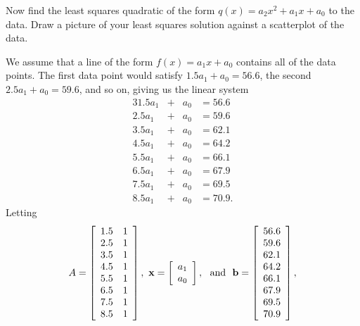 \begin{example}
		
	\item Now find the least squares quadratic of the form $q(x) = a_2x^2+a_1x+a_0$ to the data. Draw a picture of your least squares solution against a scatterplot of the data. 

	
	\ea
	


\ExampleSolution

	\ba
	\item We assume that a line of the form $f(x) = a_1x+a_0$ contains all of the data points.  The first data point would satisfy $1.5a_1+a_0 = 56.6$, the second $2.5a_1+a_0 = 59.6$, and so on, giving us the linear system
\begin{alignat*}{3}
{1.5}a_1	&{}+{}	&a_0 &{}={} 56.6{} \\ 
{2.5}a_1	&{}+{}	&a_0 &{}={} 59.6{} \\
{3.5}a_1	&{}+{}	&a_0 &{}={} 62.1{} \\
{4.5}a_1	&{}+{}	&a_0 &{}={} 64.2{}  \\
{5.5}a_1	&{}+{}	&a_0 &{}={} 66.1{} \\
{6.5}a_1	&{}+{}	&a_0 &{}={} 67.9{} \\
{7.5}a_1	&{}+{}	&a_0 &{}={} 69.5{} \\
{8.5}a_1	&{}+{}	&a_0 &{}={} 70.9{.}
\end{alignat*}
Letting 
\[A = \left[ \begin{array}{cc} 1.5&1 \\ 2.5&1 \\ 3.5&1 \\ 4.5&1 \\ 5.5&1 \\ 6.5&1 \\ 7.5&1 \\ 8.5&1 \end{array} \right], \ \vx = \left[ \begin{array}{c} a_1\\a_0 \end{array} \right], \ \text{ and } \ \vb=\left[ \begin{array}{c} 56.6\\59.6\\62.1\\64.2\\66.1\\67.9\\69.5\\70.9 \end{array} \right],\]

\end{example}
